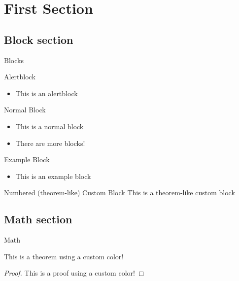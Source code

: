 \section{First Section}

\subsection{Block section}

\begin{frame}{Blocks}
	\begin{alertblock}{Alertblock}
		\begin{itemize}
			\item This is an alertblock
		\end{itemize}
	\end{alertblock}

	\pause

	\begin{block}{Normal Block}
		\begin{itemize}
			\item This is a normal block
			\item {\color{gray} There are more blocks!}
		\end{itemize}
	\end{block}

	\begin{exampleblock}{Example Block}
		\begin{itemize}
			\item This is an example block
		\end{itemize}
	\end{exampleblock}

	\begin{customblock}{Numbered (theorem-like) Custom Block}
		This is a theorem-like custom block
	\end{customblock}
\end{frame}





\subsection{Math section}

\begin{frame}{Math}
	\begin{theorem}[Theorem of me (2023)]
		This is a theorem using a custom color!
	\end{theorem}
	\begin{proof}
		This is a proof using a custom color!
	\end{proof}
\end{frame}





